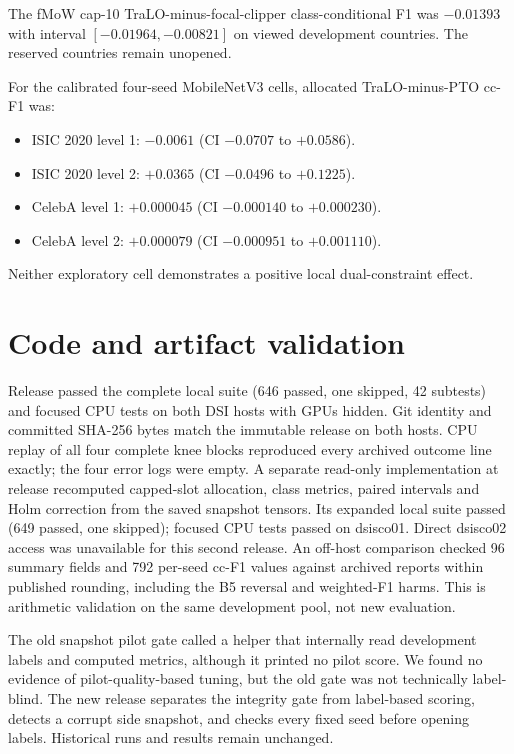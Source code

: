 \documentclass[11pt,a4paper]{article}
\begin{document}
The fMoW cap-10 TraLO-minus-focal-clipper class-conditional F1 was
$-0.01393$ with interval $[-0.01964,-0.00821]$ on viewed development
countries. The reserved countries remain unopened.

For the calibrated four-seed MobileNetV3 cells, allocated
TraLO-minus-PTO cc-F1 was:
\begin{itemize}
\item ISIC 2020 level 1: $-0.0061$ (CI $-0.0707$ to $+0.0586$).
\item ISIC 2020 level 2: $+0.0365$ (CI $-0.0496$ to $+0.1225$).
\item CelebA level 1: $+0.000045$ (CI $-0.000140$ to $+0.000230$).
\item CelebA level 2: $+0.000079$ (CI $-0.000951$ to $+0.001110$).
\end{itemize}
Neither exploratory cell demonstrates a positive local
dual-constraint effect.

\newpage
\section{Code and artifact validation}
Release 
passed the complete local suite (646 passed, one skipped, 42 subtests)
and focused CPU tests on both DSI hosts with GPUs hidden. Git identity
and committed SHA-256 bytes match the immutable release on both hosts.
CPU replay of all four complete knee blocks reproduced every archived
outcome line exactly; the four error logs were empty. A separate
read-only implementation at release 
recomputed capped-slot allocation, class metrics, paired intervals and
Holm correction from the saved snapshot tensors. Its expanded local suite
passed (649 passed, one skipped); focused CPU tests passed on dsisco01.
Direct dsisco02 access was unavailable for this second release. An
off-host comparison checked 96 summary fields and 792 per-seed cc-F1
values against archived reports within published rounding, including
the B5 reversal and weighted-F1 harms. This is
arithmetic validation on the same development pool, not new evaluation.

The old snapshot pilot gate called a helper that internally read
development labels and computed metrics, although it printed no pilot
score. We found no evidence of pilot-quality-based tuning, but the old
gate was not technically label-blind. The new release separates the
integrity gate from label-based scoring, detects a corrupt side snapshot,
and checks every fixed seed before opening labels. Historical runs and
results remain unchanged.
\end{document}
